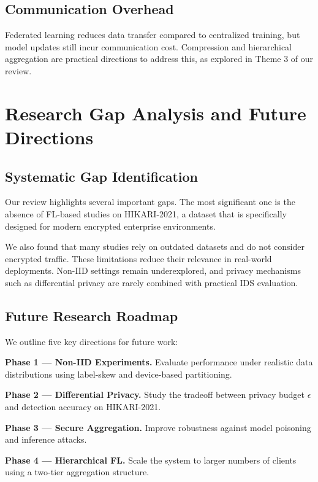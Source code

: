 \documentclass[conference]{IEEEtran}
\begin{document}
\subsection{Communication Overhead}

Federated learning reduces data transfer compared to centralized training, but model updates still incur communication cost. Compression and hierarchical aggregation are practical directions to address this, as explored in Theme 3 of our review.


\section{Research Gap Analysis and Future Directions}
\label{sec:gaps}

\subsection{Systematic Gap Identification}

Our review highlights several important gaps. The most significant one is the absence of FL-based studies on HIKARI-2021, a dataset that is specifically designed for modern encrypted enterprise environments.

We also found that many studies rely on outdated datasets and do not consider encrypted traffic. These limitations reduce their relevance in real-world deployments. Non-IID settings remain underexplored, and privacy mechanisms such as differential privacy are rarely combined with practical IDS evaluation.

\subsection{Future Research Roadmap}

We outline five key directions for future work:

\textbf{Phase 1 --- Non-IID Experiments.} Evaluate performance under realistic data distributions using label-skew and device-based partitioning.

\textbf{Phase 2 --- Differential Privacy.} Study the tradeoff between privacy budget $\epsilon$ and detection accuracy on HIKARI-2021.

\textbf{Phase 3 --- Secure Aggregation.} Improve robustness against model poisoning and inference attacks.

\textbf{Phase 4 --- Hierarchical FL.} Scale the system to larger numbers of clients using a two-tier aggregation structure.
\end{document}
